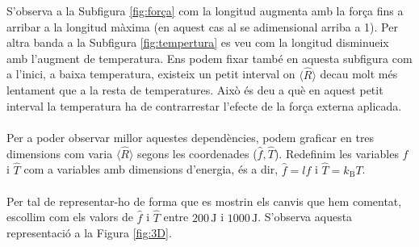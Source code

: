 \documentclass[12pt,twosides,onecolumn,openany]{article}
\begin{document}
S'observa a la Subfigura \ref{fig:força} com la longitud augmenta amb la força fins a arribar a la longitud màxima (en aquest cas al se adimensional arriba a 1). Per altra banda a la Subfigura \ref{fig:tempertura} es veu com la longitud disminueix amb l'augment de temperatura. Ens podem fixar també en aquesta subfigura com a l'inici, a baixa temperatura, existeix un petit interval on $\langle \hat{R} \rangle$ decau molt més lentament que a la resta de temperatures. Això és deu a què en aquest petit interval la temperatura ha de contrarrestar l'efecte de la força externa aplicada.\\\\
Per a poder observar millor aquestes dependències, podem graficar en tres dimensions com varia $\langle \hat{R} \rangle$ segons les coordenades ($\hat{f}, \hat{T}$). Redefinim les variables $\hat{f}$ i $\hat{T}$ com a variables amb dimensions d'energia, és a dir, $\hat{f} = lf$ i $\hat{T} = k_{\text{B}}T$.\\\\
Per tal de representar-ho de forma que es mostrin els canvis que hem comentat, escollim com els valors de $\hat{f}$ i $\hat{T}$ entre \(200\,\text{J}\) i \(1000\,\text{J}\). S'observa aquesta representació a la Figura \ref{fig:3D}.
\newpage
\end{document}
